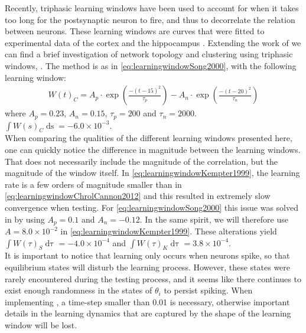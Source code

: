 Recently, triphasic learning windows have been used to account for when it takes too long for the postsynaptic neuron to fire, and thus to decorrelate the relation between neurons. These learning windows are curves that were fitted to experimental data of the cortex and the hippocampus \cite{ChrolCannon2014}. 
Extending the work of \cite{Song2000} we can find a brief investigation of network topology and clustering using triphasic windows, \cite{ChrolCannon2012}. The method is as in \eqref{eq:learningwindowSong2000}, with the following learning window:
\begin{align}
W(t)_C = A_{p} \cdot \exp \left(\frac{-\left(t - 15 \right)^{2}}{ \tau_{p}}\right) - A_{n} \cdot \exp \left(\frac{-\left(t - 20\right)^{2}}{ \tau_{n}}\right)  \label{eq:learningwindowChrolCannon2012}
\end{align}
where $A_{p}=0.23$, $A_{n}=0.15$, $\tau_{p}=200$ and $\tau_n = 2000$. $\int W(s)_C \mathop{d s} = -6.0 \times 10^{-3}$. \\

When comparing the qualities of the different learning windows presented here, one can quickly notice the difference in magnitude between the learning windows. That does not necessarily include the magnitude of the correlation, but the magnitude of the window itself. In \eqref{eq:learningwindowKempter1999}, the learning rate is a few orders of magnitude smaller than in \eqref{eq:learningwindowChrolCannon2012} and this resulted in extremely slow convergence when testing. For \eqref{eq:learningwindowSong2000} this issue was solved in \cite{ChrolCannon2012} by using $A _p = 0.1$ and $A_n = -0.12$. In the same spirit, we will therefore use $A = 8.0 \times 10^{-2}$ in \eqref{eq:learningwindowKempter1999}. These alterations yield $\int W(\tau)_S \mathop{d \tau} = -4.0 \times 10^{-4}$ and $\int W(\tau)_K \mathop{d \tau} = 3.8 \times 10^{-4}$.\\


It is important to notice that learning only occurs when neurons spike, so that equilibrium states will disturb the learning process. However, these states were rarely encountered during the testing process, and it seems like there continues to exist enough randomness in the states of $\theta_i$ to persist spiking.
When implementing \STDP, a time-step smaller than 0.01 is necessary, otherwise important details in the learning dynamics that are captured by the shape of the learning window will be lost. 

